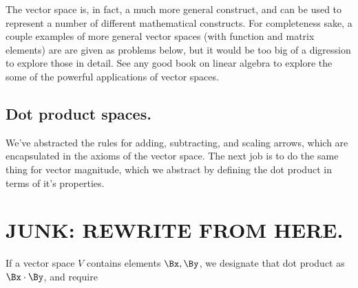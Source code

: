 The vector space is, in fact, a much more general construct, and can be used to represent a number of different mathematical constructs.  For completeness sake,
a couple examples of more general vector spaces (with function and matrix elements) are
are given as problems below, but it would be too big of a digression to explore those in detail.  See any good book on linear algebra to explore the some of the powerful applications of vector spaces.



\subsection{Dot product spaces.}
We've abstracted the rules for adding, subtracting, and scaling arrows, which are encapsulated in the axioms of the vector space.  The next job is to do the same thing for vector magnitude, which we abstract by defining the dot product in terms of it's properties.



\section{JUNK: REWRITE FROM HERE.}

%
%
%
If a vector space \( V \) contains elements \( \Bx, \By \), we designate that dot product as \( \Bx \cdot \By \), and require


